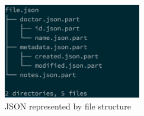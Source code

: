\begin{figure}[H]
  \centering
  \includegraphics[width = 6cm]{images/json_file_structure.png}
  \caption{
  	JSON represented by file structure
  }
  \label{fig:json_file_structure}
\end{figure}